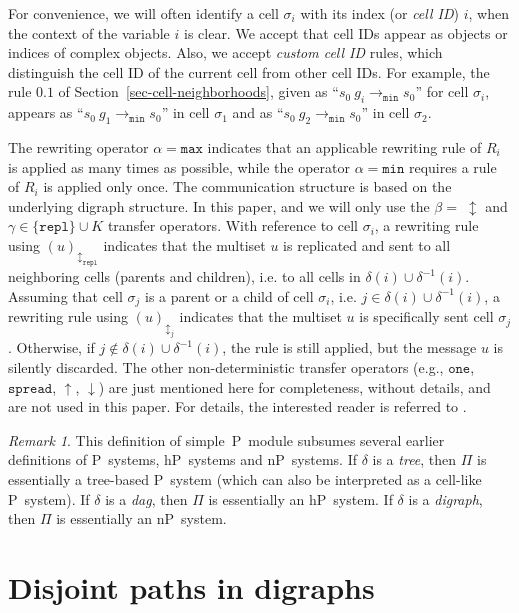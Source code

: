 \documentclass[preliminary,copyright,creativecommons]{eptcs}
\theoremstyle{remark}
\newtheorem{remark}[theorem]{Remark}
\newcommand{\modmin}{\mathtt{min}}
\newcommand{\modmax}{\mathtt{max}}
\newcommand{\modone}{\mathtt{one}}
\newcommand{\modspread}{\mathtt{spread}}
\newcommand{\modrepl}{\mathtt{repl}}
\begin{document}
For convenience, we will often identify a cell $\sigma_i$ with its index (or
\emph{cell ID}) $i$, when the context of the variable $i$ is clear.
We accept that cell IDs appear as objects or indices of complex objects.
Also, we accept \emph{custom cell ID} rules, which distinguish the cell ID of
the current cell from other cell IDs.
For example, the rule $0.1$ of Section~\ref{sec-cell-neighborhoods}, 
given as ``$s_0~ g_i \rightarrow_{\modmin} s_0$'' for cell $\sigma_i$,
appears as ``$s_0~ g_1 \rightarrow_{\modmin} s_0$'' in cell $\sigma_1$ 
and as ``$s_0~ g_2 \rightarrow_{\modmin} s_0$'' in cell $\sigma_2$.

The rewriting operator $\alpha = \modmax$
indicates that an applicable rewriting rule of $R_i$ is applied as many times as
possible, while the operator $\alpha = \modmin$ requires a rule of $R_i$ is 
applied only once.
The communication structure is based on the underlying digraph structure.  
In this paper, and we will only use the $\beta =\; \updownarrow$ 
and  $\gamma \in \{ \modrepl \} \cup K$ transfer operators.
With reference to cell $\sigma_i$, 
a rewriting rule using $(u)_{\updownarrow_{\modrepl}}$ indicates
that the multiset $u$ is replicated and sent to all neighboring cells
(parents and children), i.e. to all cells in $\delta(i) \cup \delta^{-1}(i)$. 
Assuming that cell $\sigma_j$ is a parent or a child of cell $\sigma_i$, 
i.e. $j \in \delta(i) \cup \delta^{-1}(i)$,
a rewriting rule using $(u)_{\updownarrow_j}$
indicates that the multiset $u$ is specifically sent cell $\sigma_j$.
Otherwise, if $j \notin \delta(i) \cup \delta^{-1}(i)$,
the rule is still applied, but the message $u$ is silently discarded.
The other non-deterministic transfer operators (e.g., $\modone$, $\modspread$,
$\uparrow$, $\downarrow$) are just mentioned here for completeness,
without details, and are not used in this paper.
For details, the interested reader is referred to \cite{DKN-JLAP2010}.

\begin{remark}
This definition of simple~P~module subsumes several earlier definitions of P~systems, hP~systems and nP~systems.
If $\delta$ is a \emph{tree}, then $\Pi$ is essentially a tree-based P~system 
(which can also be interpreted as a cell-like P~system).
If $\delta$ is a \emph{dag}, then $\Pi$ is essentially an hP~system.
If $\delta$ is a \emph{digraph}, then $\Pi$ is essentially an nP~system.
\end{remark}


\section{Disjoint paths in digraphs}
\label{sec-disjoint-paths}
\end{document}

